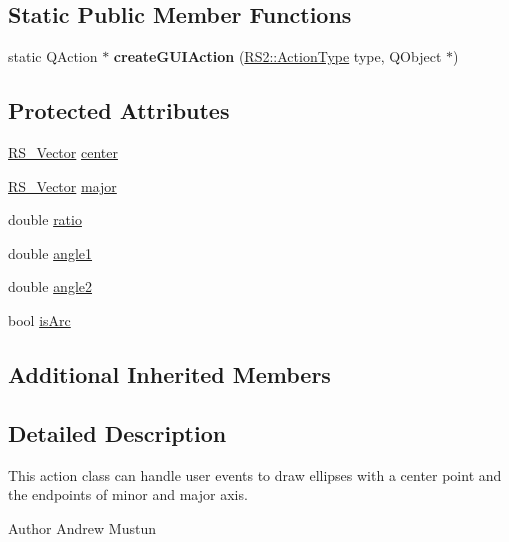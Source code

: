 \subsection*{Static Public Member Functions}
\begin{DoxyCompactItemize}
\item 
\hypertarget{classRS__ActionDrawEllipseAxis_aceba50e8e3dd37e242fa716aa4cee22c}{static Q\-Action $\ast$ {\bfseries create\-G\-U\-I\-Action} (\hyperlink{classRS2_afe3523e0bc41fd637b892321cfc4b9d7}{R\-S2\-::\-Action\-Type} type, Q\-Object $\ast$)}\label{classRS__ActionDrawEllipseAxis_aceba50e8e3dd37e242fa716aa4cee22c}

\end{DoxyCompactItemize}
\subsection*{Protected Attributes}
\begin{DoxyCompactItemize}
\item 
\hyperlink{classRS__Vector}{R\-S\-\_\-\-Vector} \hyperlink{classRS__ActionDrawEllipseAxis_a2bdbf23b41a18e11bb86588aedf3135d}{center}
\item 
\hyperlink{classRS__Vector}{R\-S\-\_\-\-Vector} \hyperlink{classRS__ActionDrawEllipseAxis_ae736862026b1e6a4b8441967c99ee33c}{major}
\item 
double \hyperlink{classRS__ActionDrawEllipseAxis_a96b61e75a170b49e54442e24edd71b49}{ratio}
\item 
double \hyperlink{classRS__ActionDrawEllipseAxis_a9d154b2c662efb24c3957fcdcf28dc46}{angle1}
\item 
double \hyperlink{classRS__ActionDrawEllipseAxis_a55342fe33bf057f5542ebad5ecfdb74b}{angle2}
\item 
bool \hyperlink{classRS__ActionDrawEllipseAxis_a325339ed6e8fad3e25930f0bc80b8264}{is\-Arc}
\end{DoxyCompactItemize}
\subsection*{Additional Inherited Members}


\subsection{Detailed Description}
This action class can handle user events to draw ellipses with a center point and the endpoints of minor and major axis.

\begin{DoxyAuthor}{Author}
Andrew Mustun 
\end{DoxyAuthor}


